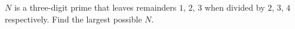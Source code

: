 $N$ is a three-digit prime that leaves remainders $1$, $2$, $3$ when divided by $2$, $3$, $4$ respectively. Find the largest possible $N$.
